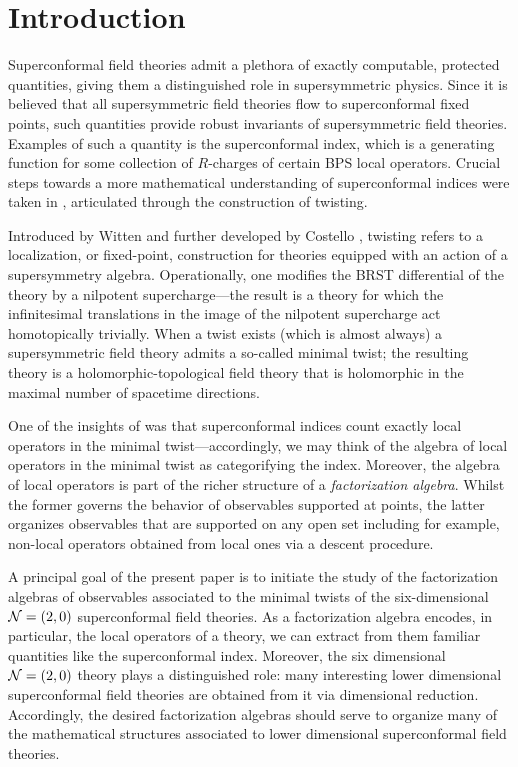 %
%

%

\section{Introduction}
Superconformal field theories admit a plethora of exactly computable, protected quantities, giving them a distinguished role in supersymmetric physics. 
Since it is believed that all supersymmetric field theories flow to superconformal fixed points, such quantities provide robust invariants of supersymmetric field theories. 
Examples of such a quantity is the superconformal index, which is a generating function for some collection of $R$-charges of certain BPS local operators. 
Crucial steps towards a more mathematical understanding of superconformal indices were taken in \cite{HolomorphicCharacters}, articulated through the construction of twisting.

Introduced by Witten \cite{WittenTwist} and further developed by Costello \cite{CostelloHol}, twisting refers to a localization, or fixed-point, construction for theories equipped with an action of a supersymmetry algebra. 
Operationally, one modifies the BRST differential of the theory by a nilpotent supercharge---the result is a theory for which the infinitesimal translations in the image of the nilpotent supercharge act homotopically trivially. 
When a twist exists (which is almost always) a supersymmetric field theory admits a so-called minimal twist; the resulting theory is a holomorphic-topological field theory that is holomorphic in the maximal number of spacetime directions.

One of the insights of \cite{HolomorphicCharacters} was that superconformal indices count exactly local operators in the minimal twist---accordingly, we may think of the algebra of local operators in the minimal twist as categorifying the index.
Moreover, the algebra of local operators is part of the richer structure of a \textit{factorization algebra}. 
Whilst the former governs the behavior of observables supported at points, the latter organizes observables that are supported on any open set including for example, non-local operators obtained from local ones via a descent procedure.

A principal goal of the present paper is to initiate the study of the factorization algebras of observables associated to the minimal twists of the six-dimensional~$\mathcal N=(2,0)$ superconformal field theories.
As a factorization algebra encodes, in particular, the local operators of a theory, we can extract from them familiar quantities like the superconformal index. Moreover, the six dimensional $\mathcal N = (2,0)$ theory plays a distinguished role: many interesting lower dimensional superconformal field theories are obtained from it via dimensional reduction. Accordingly, the desired factorization algebras should serve to organize many of the mathematical structures associated to lower dimensional superconformal field theories.


